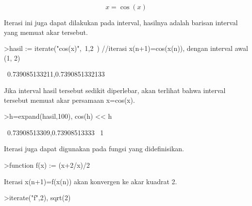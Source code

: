 \documentclass{article}
\begin{document}
\begin{eulernotebook}
\begin{eulercomment}
\begin{eulercomment}
\begin{eulercomment}
\begin{eulercomment}
\begin{eulercomment}
\begin{eulercomment}
\begin{eulercomment}
\begin{eulercomment}
\begin{eulercomment}
\begin{eulercomment}
\begin{eulercomment}
\begin{eulercomment}
\begin{eulercomment}
\begin{eulercomment}
\begin{eulercomment}
\begin{eulercomment}
\begin{eulercomment}
\begin{eulercomment}
\begin{eulercomment}
\begin{eulercomment}
\begin{eulercomment}
\begin{eulercomment}
\begin{eulercomment}
\begin{eulercomment}
\begin{eulercomment}
\begin{eulercomment}
\begin{eulercomment}
\begin{eulercomment}
\begin{eulercomment}
\begin{eulercomment}
\begin{eulercomment}
\begin{eulercomment}
\begin{eulercomment}
\end{eulercomment}
\begin{eulerformula}
\[
x = \cos(x)
\]
\end{eulerformula}
\begin{eulercomment}
Iterasi ini juga dapat dilakukan pada interval, hasilnya adalah
barisan interval yang memuat akar tersebut.
\end{eulercomment}
\begin{eulerprompt}
>hasil := iterate("cos(x)",~1,2~) //iterasi x(n+1)=cos(x(n)), dengan interval awal (1, 2)
\end{eulerprompt}
\begin{euleroutput}
  ~0.739085133211,0.7390851332133~
\end{euleroutput}
\begin{eulercomment}
Jika interval hasil tersebut sedikit diperlebar, akan terlihat bahwa
interval tersebut memuat akar persamaan x=cos(x).
\end{eulercomment}
\begin{eulerprompt}
>h=expand(hasil,100), cos(h) << h
\end{eulerprompt}
\begin{euleroutput}
  ~0.73908513309,0.73908513333~
  1
\end{euleroutput}
\begin{eulercomment}
Iterasi juga dapat digunakan pada fungsi yang didefinisikan.
\end{eulercomment}
\begin{eulerprompt}
>function f(x) := (x+2/x)/2
\end{eulerprompt}
\begin{eulercomment}
Iterasi x(n+1)=f(x(n)) akan konvergen ke akar kuadrat 2.
\end{eulercomment}
\begin{eulerprompt}
>iterate("f",2), sqrt(2)
\end{eulerprompt}
\begin{euleroutput}

\end{euleroutput}
\end{eulercomment}
\end{eulercomment}
\end{eulercomment}
\end{eulercomment}
\end{eulercomment}
\end{eulercomment}
\end{eulercomment}
\end{eulercomment}
\end{eulercomment}
\end{eulercomment}
\end{eulercomment}
\end{eulercomment}
\end{eulercomment}
\end{eulercomment}
\end{eulercomment}
\end{eulercomment}
\end{eulercomment}
\end{eulercomment}
\end{eulercomment}
\end{eulercomment}
\end{eulercomment}
\end{eulercomment}
\end{eulercomment}
\end{eulercomment}
\end{eulercomment}
\end{eulercomment}
\end{eulercomment}
\end{eulercomment}
\end{eulercomment}
\end{eulercomment}
\end{eulercomment}
\end{eulercomment}
\end{eulernotebook}
\end{document}
